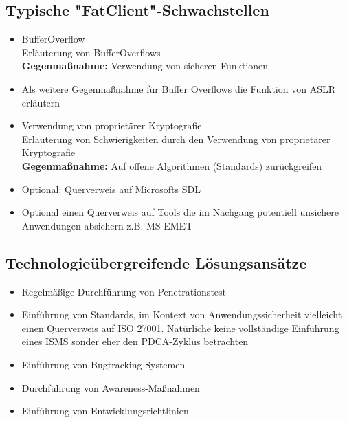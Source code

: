 \subsection{Typische "FatClient"-Schwachstellen}

\begin{itemize}
      \item BufferOverflow\\
        Erläuterung von BufferOverflows\\ 
      	\textbf{Gegenmaßnahme:} Verwendung von sicheren Funktionen
      \item Als weitere Gegenmaßnahme für Buffer Overflows die Funktion von ASLR erläutern
      \item Verwendung von proprietärer Kryptografie\\
        Erläuterung von Schwierigkeiten durch den Verwendung von proprietärer Kryptografie\\ 
      	\textbf{Gegenmaßnahme:}  Auf offene Algorithmen (Standards) zurückgreifen
      \item Optional: Querverweis auf Microsofts SDL
      \item Optional einen Querverweis auf Tools die im Nachgang potentiell unsichere Anwendungen absichern z.B. MS EMET
\end{itemize}


\subsection{Technologieübergreifende Lösungsansätze}

\begin{itemize}
      \item Regelmäßige Durchführung von Penetrationstest
      \item Einführung von Standards, im Kontext von Anwendungssicherheit vielleicht einen Querverweis auf ISO 27001. Natürliche keine vollständige Einführung eines ISMS sonder eher den PDCA-Zyklus betrachten
      \item Einführung von Bugtracking-Systemen
      \item Durchführung von Awareness-Maßnahmen 
      \item Einführung von Entwicklungsrichtlinien 
\end{itemize}